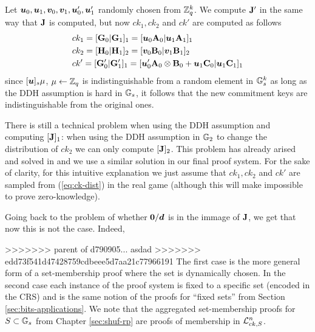 Let ${\boldsymbol{u}}_0,{\boldsymbol{u}}_1,{\boldsymbol{v}}_0,{\boldsymbol{v}}_1,{\boldsymbol{u}}'_0,{\boldsymbol{u}}'_1$ randomly chosen from $\mathbb{Z}_q^k$. We compute $\mathbf{{J}}'$ in the same way that $\mathbf{{J}}$ is computed, but now $ck_1,ck_2$ and $ck'$ are computed as follows
\begin{align}
&ck_1 = [\mathbf{{G}}_0|\mathbf{{G}}_1]_1 = [{\boldsymbol{u}}_0\mathbf{{A}}_{0}|{\boldsymbol{u}}_1\mathbf{{A}}_1]_1 \nonumber \\
&ck_2 = [\mathbf{{H}}_0|\mathbf{{H}}_1]_2 = [{\boldsymbol{v}}_0\mathbf{{B}}_{0}|{\boldsymbol{v}}_1\mathbf{{B}}_1]_2 \nonumber \\
&ck' =  [\mathbf{{G}}'_0|\mathbf{{G}}'_1]_1 = [{\boldsymbol{u}}'_0\mathbf{{A}}_0\otimes\mathbf{{B}}_0 + {\boldsymbol{u}}_1\mathbf{{C}}_0|{\boldsymbol{u}}_1\mathbf{{C}}_1]_1 \label{eq:ck-dist}
\end{align}
since $[{\boldsymbol{u}}]_s\mu$, $\mu\gets \mathbb{Z}_q$ is indistinguishable from a random element in $\mathbb{G}_s^k$ as long as the DDH assumption is hard in $\mathbb{G}_s$, it follows that the new commitment keys are indistinguishable from the original ones.

There is still a technical problem when using the DDH assumption and computing $[\mathbf{{J}}]_1$: when using the DDH assumption in $\mathbb{G}_2$ to change the distribution of $ck_2$ we can only compute $[\mathbf{{J}}]_2$. This problem has already arised and solved in \cite{AC:GonHevRaf15} and we use a similar solution in our final proof system. For the sake of clarity, for this intuitive explanation we just assume that $ck_1,ck_2$ and $ck'$ are sampled from (\ref{eq:ck-dist}) in the real game (although this will make impossible to prove zero-knowledge).

Going back to the problem of whether ${\boldsymbol{0}}/ {\boldsymbol{d}}$ is in the immage of $\mathbf{{J}}$, we get that now this is not the case. Indeed, 


>>>>>>> parent of d790905... asdad
>>>>>>> edd73f541d47428759cdbeee5d7aa21c77966191
The first case is the more general form of a set-membership proof where the set is dynamically chosen. In the second case each instance of the proof system is fixed to a specific set (encoded in the CRS) and is the same notion of the proofs for ``fixed sets'' from Section \ref{sec:bits-applications}. We note that the aggregated set-membership proofs for $S\subset\mathbb{G}_s$ from Chapter \ref{sec:shuf-rp} are proofs of membership in $\mathcal{L}_{ck,S}^n$.

